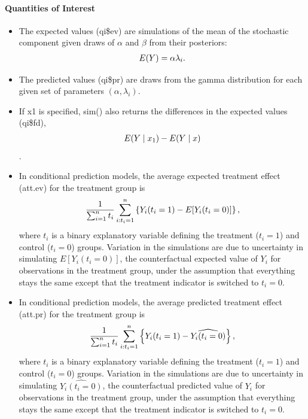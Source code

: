 \documentclass[letterpaper,10pt,english]{sphinxmanual}
\begin{document}
\paragraph{Quantities of Interest}
\label{zelig-gamma:quantities-of-interest}\begin{itemize}
\item {} 
The expected values (qi\$ev) are simulations of the mean of the
stochastic component given draws of \(\alpha\) and \(\beta\)
from their posteriors:
\begin{gather}
\begin{split}E(Y) = \alpha \lambda_i.\end{split}\notag
\end{gather}
\item {} 
The predicted values (qi\$pr) are draws from the gamma distribution
for each given set of parameters \((\alpha, \lambda_i)\).

\item {} 
If x1 is specified, sim() also returns the differences in the
expected values (qi\$fd),
\begin{gather}
\begin{split}E(Y \mid x_1) -
  E(Y \mid x)\end{split}\notag
\end{gather}
.

\item {} 
In conditional prediction models, the average expected treatment
effect (att.ev) for the treatment group is
\begin{gather}
\begin{split}\frac{1}{\sum_{i=1}^n t_i}\sum_{i:t_i=1}^n \left\{ Y_i(t_i=1) -
      E[Y_i(t_i=0)] \right\},\end{split}\notag
\end{gather}
where \(t_i\) is a binary explanatory variable defining the
treatment (\(t_i=1\)) and control (\(t_i=0\)) groups.
Variation in the simulations are due to uncertainty in simulating
\(E[Y_i(t_i=0)]\), the counterfactual expected value of
\(Y_i\) for observations in the treatment group, under the
assumption that everything stays the same except that the treatment
indicator is switched to \(t_i=0\).

\item {} 
In conditional prediction models, the average predicted treatment
effect (att.pr) for the treatment group is
\begin{gather}
\begin{split}\frac{1}{\sum_{i=1}^n t_i}\sum_{i:t_i=1}^n \left\{ Y_i(t_i=1) -
      \widehat{Y_i(t_i=0)} \right\},\end{split}\notag
\end{gather}
where \(t_i\) is a binary explanatory variable defining the
treatment (\(t_i=1\)) and control (\(t_i=0\)) groups.
Variation in the simulations are due to uncertainty in simulating
\(\widehat{Y_i(t_i=0)}\), the counterfactual predicted value of
\(Y_i\) for observations in the treatment group, under the
assumption that everything stays the same except that the treatment
indicator is switched to \(t_i=0\).

\end{itemize}
\end{document}
